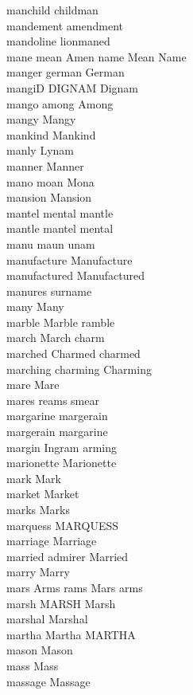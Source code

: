 manchild childman\\
mandement amendment\\
mandoline lionmaned\\
mane mean Amen name Mean Name\\
manger german German\\
mangiD DIGNAM Dignam\\
mango among Among\\
mangy Mangy\\
mankind Mankind\\
manly Lynam\\
manner Manner\\
mano moan Mona\\
mansion Mansion\\
mantel mental mantle\\
mantle mantel mental\\
manu maun unam\\
manufacture Manufacture\\
manufactured Manufactured\\
manures surname\\
many Many\\
marble Marble ramble\\
march March charm\\
marched Charmed charmed\\
marching charming Charming\\
mare Mare\\
mares reams smear\\
margarine margerain\\
margerain margarine\\
margin Ingram arming\\
marionette Marionette\\
mark Mark\\
market Market\\
marks Marks\\
marquess MARQUESS\\
marriage Marriage\\
married admirer Married\\
marry Marry\\
mars Arms rams Mars arms\\
marsh MARSH Marsh\\
marshal Marshal\\
martha Martha MARTHA\\
mason Mason\\
mass Mass\\
massage Massage\\
